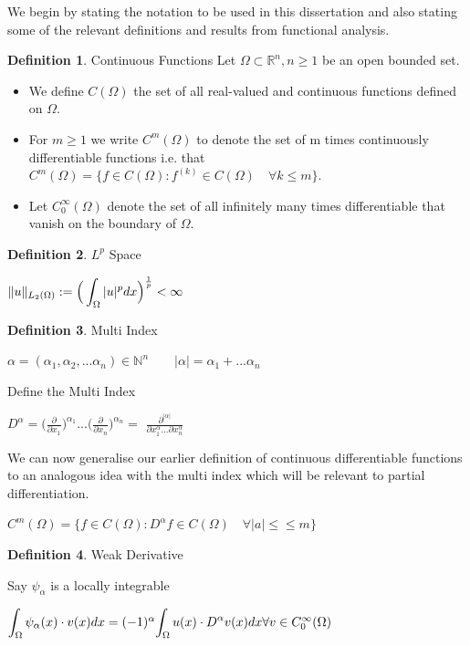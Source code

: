 \documentclass{uonmathreport}
\theoremstyle{definition}
\newtheorem{definition}{Definition}[section]
\theoremstyle{problem}
\theoremstyle{theorem}
\begin{document}
We begin by stating the notation to be used in this dissertation and also stating some of the relevant definitions and results from functional analysis.

\theoremstyle{definition}
\begin{definition}{Continuous Functions}
Let $\Omega \subset \mathbb{R}^n, n \geq 1$ be an open bounded set. 
\begin{itemize}
\item We define $C(\Omega)$  the set of all real-valued and continuous functions defined on $\Omega$.
\item For $m \geq1$ we write $C^m(\Omega)$ to denote the set of m times continuously differentiable functions  i.e. that $C^m(\Omega) = \{f \in C(\Omega) : f^{(k)} \in C(\Omega)\quad \forall k \leq m\} $.
\item Let $C^{\infty}_0(\Omega) $ denote the set of all infinitely many times differentiable that vanish on the boundary of $\Omega$.
\end{itemize}
\end{definition}

\theoremstyle{definition}
\begin{definition}{$L^p$ Space}

$\|u\|_{L_2(\Omega)} := \mathlarger{\Big(\int_\Omega  { |u|^p } dx\Big)}^{\frac{1}{p}} < \infty$

\end{definition}


\theoremstyle{definition}
\begin{definition}{Multi Index}

$\alpha = (\alpha_1, \alpha_2, ... \alpha_n) \in \mathbb{N}^n \quad \quad   |\alpha| = \alpha_1 + ... \alpha_n$

Define the Multi Index 

$D^{\alpha} = \Big(\frac{\partial}{\partial x_1}\Big)^{\alpha_1}...\Big(\frac{\partial}{\partial x_n}\Big)^{\alpha_n} = $
$\frac{\partial^{|\alpha|}}{\partial x^{\alpha}_1 ... \partial x^{\alpha}_n}$

We can now generalise our earlier definition of continuous differentiable functions to an analogous idea with the multi index which will be relevant to partial differentiation.

$C^m(\Omega) = \{f \in C(\Omega) : D^\alpha f \in C(\Omega)\quad \forall |a| \leq\leq m\} $

\end{definition}


\theoremstyle{definition}
\begin{definition}{Weak Derivative}

Say $\psi_\alpha$ is a locally integrable 

$\mathlarger{\int_\Omega  \psi_\alpha(x) \cdot v(x) dx} = (-1)^{\alpha} \mathlarger{\int_\Omega  u(x) \cdot D^{\alpha} v(x) dx} \forall v \in C^\infty_0(\Omega)$

\end{definition}
\end{document}
